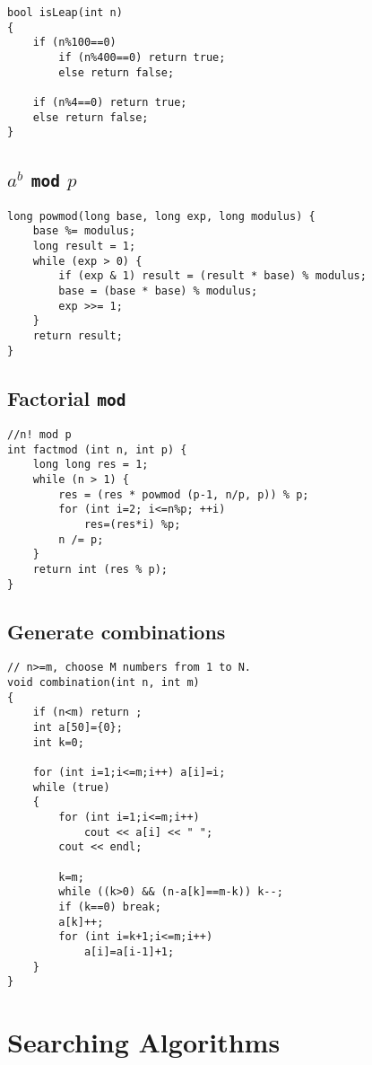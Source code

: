 \documentclass[a4paper]{article}
\begin{document}
\begin{verbatim}
bool isLeap(int n)
{
	if (n%100==0)
		if (n%400==0) return true;
		else return false;

	if (n%4==0) return true;
	else return false;
}
\end{verbatim}

\subsection{$a^b$ \texttt{mod} $p$}
\begin{verbatim}
long powmod(long base, long exp, long modulus) {
	base %= modulus;
	long result = 1;
	while (exp > 0) {
		if (exp & 1) result = (result * base) % modulus;
		base = (base * base) % modulus;
		exp >>= 1;
	}
	return result;
}
\end{verbatim}

\subsection{Factorial \texttt{mod}}

\begin{verbatim}
//n! mod p
int factmod (int n, int p) {
	long long res = 1;
	while (n > 1) {
		res = (res * powmod (p-1, n/p, p)) % p;
		for (int i=2; i<=n%p; ++i)
			res=(res*i) %p;
		n /= p;
	}
	return int (res % p);
}
\end{verbatim}

\subsection{Generate combinations}
\begin{verbatim}
// n>=m, choose M numbers from 1 to N.
void combination(int n, int m)
{
	if (n<m) return ;
	int a[50]={0};
	int k=0;

	for (int i=1;i<=m;i++) a[i]=i;
	while (true)
	{
		for (int i=1;i<=m;i++)
			cout << a[i] << " ";
		cout << endl;

		k=m;
		while ((k>0) && (n-a[k]==m-k)) k--;
		if (k==0) break;
		a[k]++;
		for (int i=k+1;i<=m;i++)
			a[i]=a[i-1]+1;
	}
}
\end{verbatim}

\section{Searching Algorithms}
\end{document}
